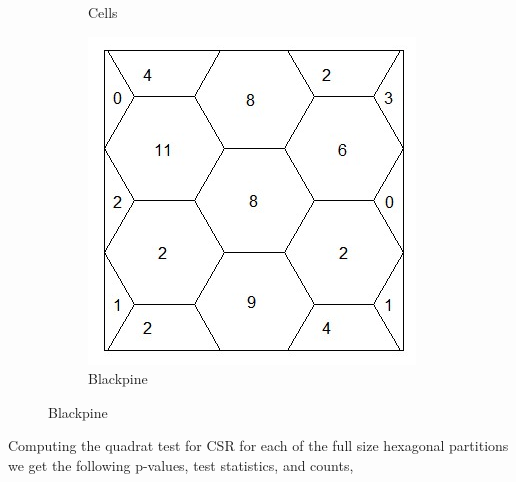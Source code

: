 \documentclass[12pt]{article}
\makeatletter
\theoremstyle{homework}
\newenvironment{exercise}[1]
{\def\@currentlabel{#1}\exercisecore}
{\endexercisecore}
\makeatother
\begin{document}
\begin{exercise}{4}
\begin{figure}[H]
\begin{subfigure}[b]{0.45\textwidth}
          \caption{Cells}
      \end{subfigure}
      \hfill
      \begin{subfigure}[b]{0.45\textwidth}
          \centering
          \includegraphics[width=\textwidth]{blackpine.jpg}
          \caption{Blackpine}
      \end{subfigure}
  \end{figure}
  Computing the quadrat test for CSR for each of the full size hexagonal partitions we get the following p-values, test statistics, and counts,
  

\end{exercise}
\end{document}
